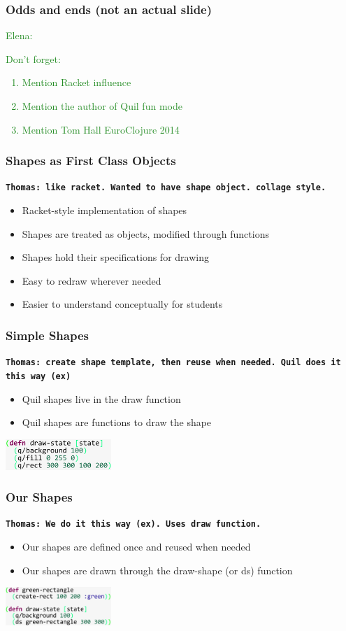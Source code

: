 \documentclass{beamer}
\newcommand{\comment}[1]{{\bf \tt  {#1}}}
\newcommand{\emcomment}[1]{\textcolor{ForestGreen}{\comment{Elena: {#1}}}}
\newcommand{\thcomment}[1]{\textcolor{BestBlue}{\comment{Thomas: {#1}}}}
\begin{document}
\begin{frame}
\frametitle{Odds and ends (not an actual slide)}
\emcomment{Don't forget:
\begin{enumerate}
\item Mention Racket influence  
\item Mention the author of Quil fun mode
\item Mention Tom Hall EuroClojure 2014
\end{enumerate}
}
\end{frame}



\begin{frame}
\frametitle{Shapes as First Class Objects}
\thcomment{like racket. Wanted to have shape object. collage style.}
	\begin{itemize}
		\item Racket-style implementation of shapes
		\item Shapes are treated as objects, modified through functions
		\item Shapes hold their specifications for drawing
		\item Easy to redraw wherever needed
		\item Easier to understand conceptually for students
	\end{itemize}
\end{frame}

\begin{frame}


\frametitle{Simple Shapes}
\thcomment{create shape template, then reuse when needed. Quil does it this way (ex)}
	\begin{itemize}
		\item Quil shapes live in the draw function
		\item Quil shapes are functions to draw the shape
	\end{itemize}
	\includegraphics[width=4cm]{PresentationImages/quilGreenRect.png}
\end{frame}

\begin{frame}
\frametitle{Our Shapes}
\thcomment{We do it this way (ex). Uses draw function.}
	\begin{itemize}
		\item Our shapes are defined once and reused when needed
		\item Our shapes are drawn through the draw-shape (or ds) function
	\end{itemize}
	\includegraphics[width=4cm]{PresentationImages/fcsGreenRect.png}
\end{frame}
\end{document}
